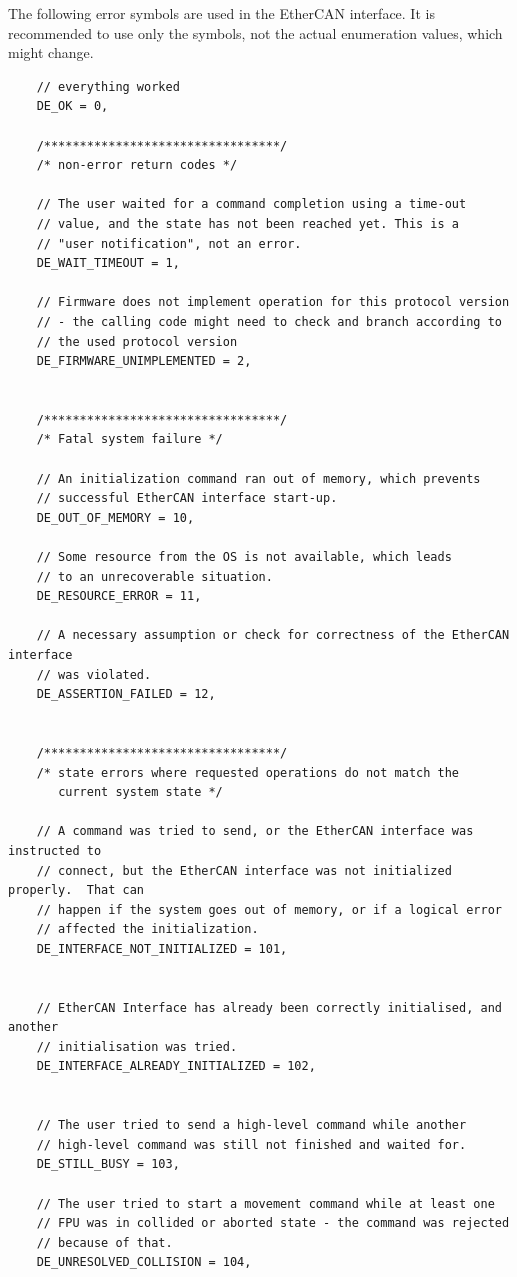 \documentclass[11pt,a4paper]{scrartcl}
\begin{document}
The following error symbols are used in the EtherCAN interface.  It is recommended
to use only the symbols, not the actual enumeration values, which
might change.


\begin{verbatim}
    // everything worked
    DE_OK = 0,

    /*********************************/
    /* non-error return codes */

    // The user waited for a command completion using a time-out
    // value, and the state has not been reached yet. This is a
    // "user notification", not an error.
    DE_WAIT_TIMEOUT = 1,

    // Firmware does not implement operation for this protocol version
    // - the calling code might need to check and branch according to
    // the used protocol version
    DE_FIRMWARE_UNIMPLEMENTED = 2,


    /*********************************/
    /* Fatal system failure */

    // An initialization command ran out of memory, which prevents
    // successful EtherCAN interface start-up.
    DE_OUT_OF_MEMORY = 10,

    // Some resource from the OS is not available, which leads
    // to an unrecoverable situation.
    DE_RESOURCE_ERROR = 11,

    // A necessary assumption or check for correctness of the EtherCAN interface
    // was violated.
    DE_ASSERTION_FAILED = 12,


    /*********************************/
    /* state errors where requested operations do not match the
       current system state */

    // A command was tried to send, or the EtherCAN interface was instructed to
    // connect, but the EtherCAN interface was not initialized properly.  That can
    // happen if the system goes out of memory, or if a logical error
    // affected the initialization.
    DE_INTERFACE_NOT_INITIALIZED = 101,


    // EtherCAN Interface has already been correctly initialised, and another
    // initialisation was tried.
    DE_INTERFACE_ALREADY_INITIALIZED = 102,


    // The user tried to send a high-level command while another
    // high-level command was still not finished and waited for.
    DE_STILL_BUSY = 103,

    // The user tried to start a movement command while at least one
    // FPU was in collided or aborted state - the command was rejected
    // because of that.
    DE_UNRESOLVED_COLLISION = 104,


\end{verbatim}
\end{document}
